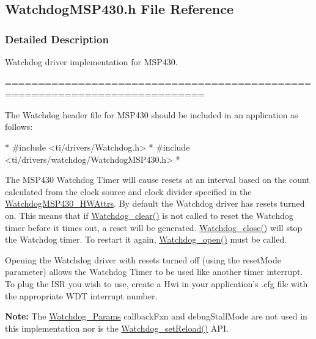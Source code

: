 \subsection{Watchdog\-M\-S\-P430.\-h File Reference}
\label{_watchdog_m_s_p430_8h}


\subsubsection{Detailed Description}
Watchdog driver implementation for M\-S\-P430. \begin{DoxyVerb}============================================================================
\end{DoxyVerb}


The Watchdog header file for M\-S\-P430 should be included in an application as follows\-: 
\begin{DoxyCode}
*  #include <ti/drivers/Watchdog.h>
*  #include <ti/drivers/watchdog/WatchdogMSP430.h>
*  
\end{DoxyCode}


The M\-S\-P430 Watchdog Timer will cause resets at an interval based on the count calculated from the clock source and clock divider specified in the \hyperlink{struct_watchdog_m_s_p430___h_w_attrs}{Watchdog\-M\-S\-P430\-\_\-\-H\-W\-Attrs}. By default the Watchdog driver has resets turned on. This means that if \hyperlink{_watchdog_8h_a396decd6b1807db10c636f9987c3be4c}{Watchdog\-\_\-clear()} is not called to reset the Watchdog timer before it times out, a reset will be generated. \hyperlink{_watchdog_8h_a1c0dfea7011b06f303d01afb631ffbdd}{Watchdog\-\_\-close()} will stop the Watchdog timer. To restart it again, \hyperlink{_watchdog_8h_aa5ce656aa6d5199e1efdb4ca2cd9fb7c}{Watchdog\-\_\-open()} must be called.

Opening the Watchdog driver with resets turned off (using the reset\-Mode parameter) allows the Watchdog Timer to be used like another timer interrupt. To plug the I\-S\-R you wish to use, create a Hwi in your application's .cfg file with the appropriate W\-D\-T interrupt number.

{\bfseries Note\-:} The \hyperlink{struct_watchdog___params}{Watchdog\-\_\-\-Params} callback\-Fxn and debug\-Stall\-Mode are not used in this implementation nor is the \hyperlink{_watchdog_8h_a77ec81e1304fe05b77a9976e10e2d9a3}{Watchdog\-\_\-set\-Reload()} A\-P\-I. 

